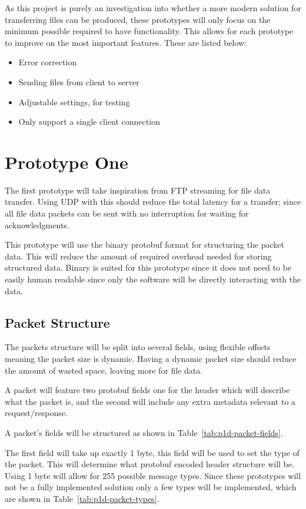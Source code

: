 As this project is purely an investigation into whether a more modern solution for transferring files can be produced, these prototypes will only focus on the minimum possible required to have functionality. This allows for each prototype to improve on the most important features. These are listed below:

\begin{itemize}
	\item Error correction
	\item Sending files from client to server
	\item Adjustable settings, for testing
	\item Only support a single client connection
\end{itemize}


\section{Prototype One}
The first prototype will take inspiration from FTP streaming for file data transfer. Using UDP with this should reduce the total latency for a transfer; since all file data packets can be sent with no interruption for waiting for acknowledgments.

This prototype will use the binary protobuf format for structuring the packet data. This will reduce the amount of required overhead needed for storing structured data. Binary is suited for this prototype since it does not need to be easily human readable since only the software will be directly interacting with the data.

\subsection*{Packet Structure}
The packets structure will be split into several fields, using flexible offsets meaning the packet size is dynamic. Having a dynamic packet size should reduce the amount of wasted space, leaving more for file data.

A packet will feature two protobuf fields one for the header which will describe what the packet is, and the second will include any extra metadata relevant to a request/response.

A packet's fields will be structured as shown in Table~\ref{tab:p1d-packet-fields}.

The first field will take up exactly 1 byte, this field will be used to set the type of the packet. This will determine what protobuf encoded header structure will be. Using 1 byte will allow for 255 possible message types. Since these prototypes will not be a fully implemented solution only a few types will be implemented, which are shown in Table~\ref{tab:p1d-packet-types}.

